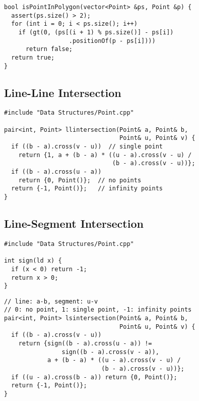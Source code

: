 \documentclass[twoside]{article}
\begin{document}
\begin{multicols*}{2}
\begin{verbatim}
bool isPointInPolygon(vector<Point> &ps, Point &p) {
  assert(ps.size() > 2);
  for (int i = 0; i < ps.size(); i++)
    if (gt(0, (ps[(i + 1) % ps.size()] - ps[i])
                  .positionOf(p - ps[i])))
      return false;
  return true;
}
\end{verbatim}

\subsectionfont{\large\bfseries\sffamily\underline}
\subsection*{Line-Line Intersection}
\begin{verbatim}
#include "Data Structures/Point.cpp"

pair<int, Point> llintersection(Point& a, Point& b,
                                Point& u, Point& v) {
  if ((b - a).cross(v - u))  // single point
    return {1, a + (b - a) * ((u - a).cross(v - u) /
                              (b - a).cross(v - u))};
  if ((b - a).cross(u - a))
    return {0, Point()};  // no points
  return {-1, Point()};   // infinity points
}
\end{verbatim}

\subsectionfont{\large\bfseries\sffamily\underline}
\subsection*{Line-Segment Intersection}
\begin{verbatim}
#include "Data Structures/Point.cpp"

int sign(ld x) {
  if (x < 0) return -1;
  return x > 0;
}
\end{verbatim}
\vspace{-12pt}
\begin{verbatim}
// line: a-b, segment: u-v
// 0: no point, 1: single point, -1: infinity points
pair<int, Point> lsintersection(Point& a, Point& b,
                                Point& u, Point& v) {
  if ((b - a).cross(v - u))
    return {sign((b - a).cross(u - a)) !=
                sign((b - a).cross(v - a)),
            a + (b - a) * ((u - a).cross(v - u) /
                           (b - a).cross(v - u))};
  if ((u - a).cross(b - a)) return {0, Point()};
  return {-1, Point()};
}
\end{verbatim}

\subsectionfont{\large\bfseries\sffamily\underline}

\end{multicols*}
\end{document}
